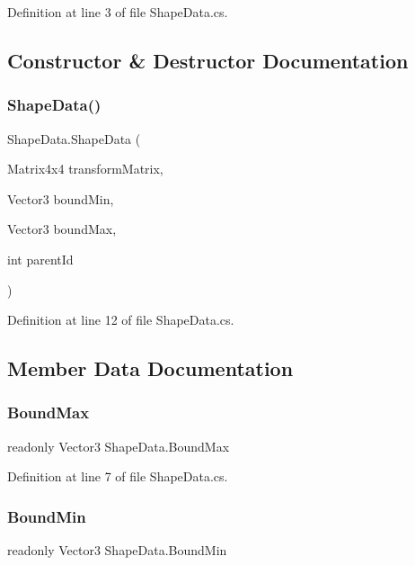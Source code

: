 Definition at line 3 of file Shape\+Data.\+cs.



\subsection{Constructor \& Destructor Documentation}
\mbox{\label{class_shape_data_ac267d3675f6750a85431b55b87fc677c}} 
\subsubsection{\texorpdfstring{ShapeData()}{ShapeData()}}
{\footnotesize\ttfamily Shape\+Data.\+Shape\+Data (\begin{DoxyParamCaption}\item[{Matrix4x4}]{transform\+Matrix,  }\item[{Vector3}]{bound\+Min,  }\item[{Vector3}]{bound\+Max,  }\item[{int}]{parent\+Id }\end{DoxyParamCaption})}



Definition at line 12 of file Shape\+Data.\+cs.



\subsection{Member Data Documentation}
\mbox{\label{class_shape_data_ad57256c9447776d39f2d65b248ad92dc}} 
\subsubsection{\texorpdfstring{BoundMax}{BoundMax}}
{\footnotesize\ttfamily readonly Vector3 Shape\+Data.\+Bound\+Max}



Definition at line 7 of file Shape\+Data.\+cs.

\mbox{\label{class_shape_data_a3852657f21bb30029363cb63257299b6}} 
\subsubsection{\texorpdfstring{BoundMin}{BoundMin}}
{\footnotesize\ttfamily readonly Vector3 Shape\+Data.\+Bound\+Min}



